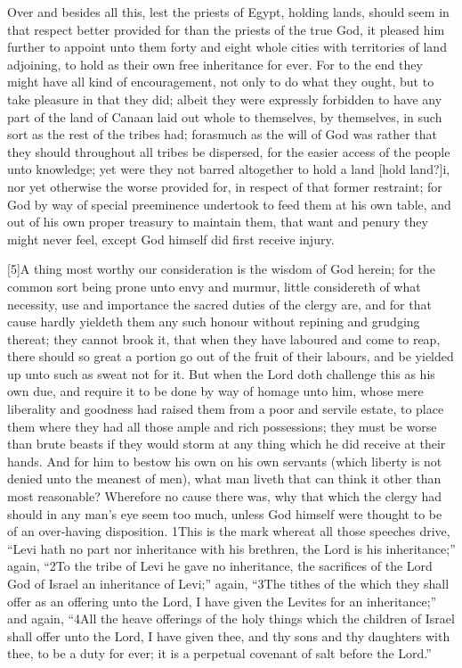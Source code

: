 Over and besides all this, lest the priests of Egypt, holding lands, should seem in that respect better provided for than the priests of the true God, it pleased him further to appoint unto them forty and eight whole cities with territories of land adjoining, to hold as their own free inheritance for ever. For to the end they might have all kind of encouragement, not only to do what they ought, but to take pleasure in that they did; albeit they were expressly forbidden to have any part of the land of Canaan laid out whole to themselves, by themselves, in such sort as the rest of the tribes had; forasmuch as the will of God was rather that they should throughout all tribes be dispersed, for the easier access of the people unto knowledge; yet were they not barred altogether to hold a land [hold land?]i, nor yet otherwise the worse provided for, in respect of that former restraint; for God by way of special preeminence undertook to feed them at his own table, and out of his own proper treasury to maintain them, that want and penury they might never feel, except God himself did first receive injury.

[5]A thing most worthy our consideration is the wisdom of God herein; for the common sort being prone unto envy and murmur, little considereth of what necessity, use and importance the sacred duties of the clergy are, and for that cause hardly yieldeth them any such honour without repining and grudging thereat; they cannot brook it, that when they have laboured and come to reap, there should so great a portion go out of the fruit of their labours, and be yielded up unto such as sweat not for it. But when the Lord doth challenge this as his own due, and require it to be done by way of homage unto him, whose mere liberality and goodness had raised them from a poor and servile estate, to place them where they had all those ample and rich possessions; they must be worse than brute beasts if they would storm at any thing which he did receive at their hands. And for him to bestow his own on his own servants (which liberty is not denied unto the meanest of men), what man liveth that can think it other than most  reasonable? Wherefore no cause there was, why that which the clergy had should in any man’s eye seem too much, unless God himself were thought to be of an over-having disposition. 1This is the mark whereat all those speeches drive, “Levi hath no part nor inheritance with his brethren, the Lord is his inheritance;” again, “2To the tribe of Levi he gave no inheritance, the sacrifices of the Lord God of Israel an inheritance of Levi;” again, “3The tithes of the which they shall offer as an offering unto the Lord, I have given the Levites for an inheritance;” and again, “4All the heave offerings of the holy things which the children of Israel shall offer unto the Lord, I have given thee, and thy sons and thy daughters with thee, to be a duty for ever; it is a perpetual covenant of salt before the Lord.”

